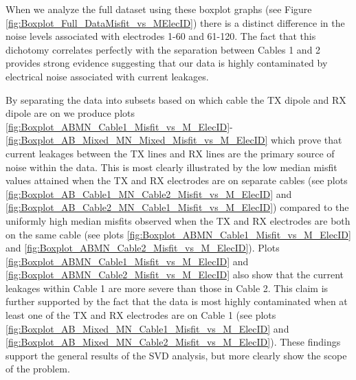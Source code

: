 \documentclass[final,authoryear,5p,times,twocolumn]{elsarticle}
\begin{document}
When we analyze the full dataset using these boxplot graphs (see Figure \ref{fig:Boxplot_Full_DataMisfit_vs_MElecID}) there is a distinct difference in the noise levels associated with electrodes 1-60 and 61-120. The fact that this dichotomy correlates perfectly with the separation between Cables 1 and 2 provides strong evidence suggesting that our data is highly contaminated by electrical noise associated with current leakages.

By separating the data into subsets based on which cable the TX dipole and RX dipole are on we produce plots \ref{fig:Boxplot_ABMN_Cable1_Misfit_vs_M_ElecID}-\ref{fig:Boxplot_AB_Mixed_MN_Mixed_Misfit_vs_M_ElecID} which prove that current leakages between the TX lines and RX lines are the primary source of noise within the data. This is most clearly illustrated by the low median misfit values attained when the TX and RX electrodes are on separate cables (see plots \ref{fig:Boxplot_AB_Cable1_MN_Cable2_Misfit_vs_M_ElecID} and \ref{fig:Boxplot_AB_Cable2_MN_Cable1_Misfit_vs_M_ElecID}) compared to the uniformly high median misfits observed when the TX and RX electrodes are both on the same cable (see plots \ref{fig:Boxplot_ABMN_Cable1_Misfit_vs_M_ElecID} and \ref{fig:Boxplot_ABMN_Cable2_Misfit_vs_M_ElecID}). Plots \ref{fig:Boxplot_ABMN_Cable1_Misfit_vs_M_ElecID} and \ref{fig:Boxplot_ABMN_Cable2_Misfit_vs_M_ElecID} also show that the current leakages within Cable 1 are more severe than those in Cable 2. This claim is further supported by the fact that the data is most highly contaminated when at least one of the TX and RX electrodes are on Cable 1 (see plots \ref{fig:Boxplot_AB_Mixed_MN_Cable1_Misfit_vs_M_ElecID} and \ref{fig:Boxplot_AB_Mixed_MN_Cable2_Misfit_vs_M_ElecID}). These findings support the general results of the SVD analysis, but more clearly show the scope of the problem.
\end{document}

